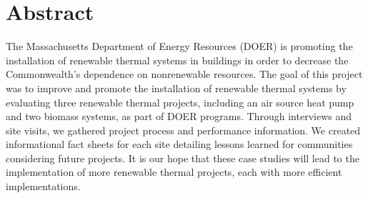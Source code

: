 \chapter*{Abstract}
%

\par The Massachusetts Department of Energy Resources (DOER) is promoting the installation of renewable thermal systems in buildings in order to decrease the Commonwealth’s dependence on nonrenewable resources. The goal of this project was to improve and promote the installation of renewable thermal systems by evaluating three renewable thermal projects, including an air source heat pump and two biomass systems, as part of DOER programs. Through interviews and site visits, we gathered project process and performance information. We created informational fact sheets for each site detailing lessons learned for communities considering future projects. It is our hope that these case studies will lead to the implementation of more renewable thermal projects, each with more efficient implementations.